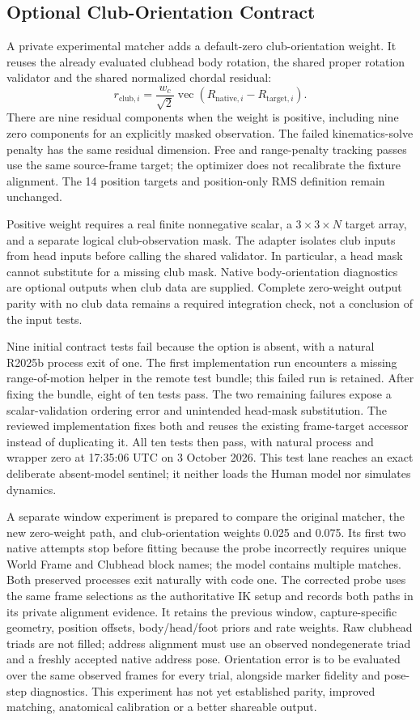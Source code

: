 \documentclass[11pt,a4paper]{article}
\begin{document}
\subsection{Optional Club-Orientation Contract}
A private experimental matcher adds a default-zero club-orientation weight.
It reuses the already evaluated clubhead body rotation, the shared proper
rotation validator and the shared normalized chordal residual:
\[
 r_{\mathrm{club},i}=\frac{w_c}{\sqrt{2}}
 \operatorname{vec}\!\left(R_{\mathrm{native},i}
       -R_{\mathrm{target},i}\right).
\]
There are nine residual components when the weight is positive, including
nine zero components for an explicitly masked observation. The failed
kinematics-solve penalty has the same residual dimension. Free and
range-penalty tracking passes use the same source-frame target; the
optimizer does not recalibrate the fixture alignment. The 14 position
targets and position-only RMS definition remain unchanged.

Positive weight requires a real finite nonnegative scalar, a $3\times3\times N$
target array, and a separate logical club-observation mask. The adapter
isolates club inputs from head inputs before calling the shared validator.
In particular, a head mask cannot substitute for a missing club mask.
Native body-orientation diagnostics are optional outputs when club data
are supplied. Complete zero-weight output parity with no club data remains
a required integration check, not a conclusion of the input tests.

Nine initial contract tests fail because the option is absent, with a
natural R2025b process exit of one. The first implementation run encounters
a missing range-of-motion helper in the remote test bundle; this failed
run is retained. After fixing the bundle, eight of ten tests pass. The two
remaining failures expose a scalar-validation ordering error and unintended
head-mask substitution. The reviewed implementation fixes both and reuses
the existing frame-target accessor instead of duplicating it. All ten tests
then pass, with natural process and wrapper zero at 17:35:06 UTC on
3 October 2026. This test lane reaches an exact deliberate absent-model
sentinel; it neither loads the Human model nor simulates dynamics.

A separate window experiment is prepared to compare the original matcher,
the new zero-weight path, and club-orientation weights 0.025 and 0.075.
Its first two native attempts stop before fitting because the probe
incorrectly requires unique World Frame and Clubhead block names; the model
contains multiple matches. Both preserved processes exit naturally with
code one. The corrected probe uses the same frame selections as the
authoritative IK setup and records both paths in its private alignment evidence.
It retains the previous window, capture-specific geometry, position offsets,
body/head/foot priors and rate weights. Raw clubhead triads are not filled;
address alignment must use an observed nondegenerate triad and a freshly
accepted native address pose. Orientation error is to be evaluated over
the same observed frames for every trial, alongside marker fidelity and
pose-step diagnostics. This experiment has not yet established parity,
improved matching, anatomical calibration or a better shareable output.
\end{document}
